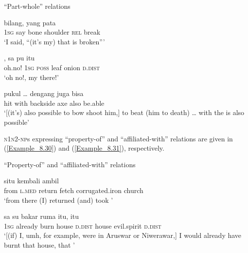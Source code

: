 \begin{styleExampleTitle}
``Part-whole'' relations
\end{styleExampleTitle}
\ea
\label{Example_8.27}
 {bilang,} {} {} {yang} {pata}\\ %
 \textsc{1sg}  say  bone  shoulder  \textsc{rel}  break\\
\glt 
‘I said, ``(it’s my)  that is broken''' \textstyleExampleSource{[081015-005-NP.0048]}
\z

\ea
\label{Example_8.28}
, {sa} {pu} {} {} {itu}\\ %
 oh.no!  \textsc{1sg}  \textsc{poss}  leaf  onion  \textsc{d.dist}\\
 ‘oh no!, my  there!’ \textstyleExampleSource{[081006-024-CvEx.0043]}
\z

\ea
\label{Example_8.29}
\gll {\ldots} {pukul} {\ldots} {dengang} {} {} {juga} {bisa}\\ %
 { }   hit  { }  with  backside  axe  also  be.able\\
 ‘[(it’s) also possible to bow shoot him,] to beat (him to death) {\ldots} with the  is also possible’ \textstyleExampleSource{[081106-001-CvPr.0002]}
\z



\textsc{n1n2-np}s expressing ``property-of'' and ``affiliated-with'' relations are given in (\ref{Example_8.30}) and (\ref{Example_8.31}), respectively.



\begin{styleExampleTitle}
``Property-of'' and ``affiliated-with'' relations
\end{styleExampleTitle}
\ea
\label{Example_8.30}
 {situ} {kembali} {ambil} {} {}\\ %
 from  \textsc{l.med}  return  fetch  corrugated.iron  church\\
\glt 
‘from there (I) returned (and) took ’ \textstyleExampleSource{[080927-004-CvNP.0005]}
\z

\ea
\label{Example_8.31}
\gll {\ldots} {sa} {su} {bakar} {ruma} {itu,} {} {} {itu}\\ %
  { } \textsc{1sg}  already  burn  house  \textsc{d.dist}  house  evil.spirit  \textsc{d.dist}\\
\glt 
‘[(if) I, umh, for example, were in Aruswar or Niwerawar,] I would already have burnt that house, that ’ \textstyleExampleSource{[081025-009a-Cv.0198]}
\z



